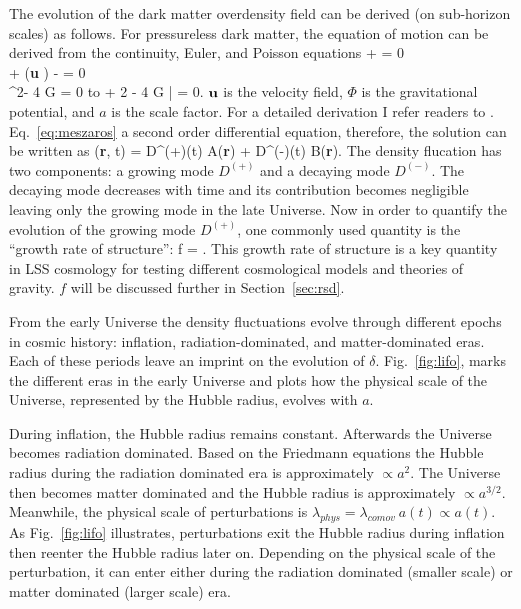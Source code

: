 The evolution of the dark matter overdensity field can be derived (on 
sub-horizon scales) as follows. For pressureless dark matter, the equation of motion
can be derived from the continuity, Euler, and Poisson equations
\beqa 
{} + \nabla \dot {} = 0  \\ 
 + ({\bf u} \dot \nabla)  - \nabla\Phi = 0 \\ 
\nabla^2\Phi - 4 \pi G \rho = 0 
\eeqa
to 
\beq \label{eq:meszaros}
 + 2   - 4 \pi G \bar{\rho} \delta = 0.
\eeq
${\bf u}$ is the velocity field, $\Phi$ is the gravitational potential, and $a$ 
is the scale factor. For a detailed derivation I refer readers to . Eq.~\ref{eq:meszaros} a second order differential equation, therefore,
the solution can be written as 
\beq 
\delta({\bf r}, t) = D^{(+)}(t) A({\bf r}) + D^{(-)}(t) B({\bf r}).
\eeq
The density flucation has two components: a growing mode $D^{(+)}$ and a decaying 
mode $D^{(-)}$. The decaying mode decreases with time and its contribution becomes negligible
leaving only the growing mode in the late Universe. Now in order to quantify
the evolution of the growing mode $D^{(+)}$, one commonly used quantity is the 
``growth rate of structure'': 
\beq \label{eq:f_growth}
f = . 
\eeq
This growth rate of structure is a key quantity in LSS cosmology for testing different 
cosmological models and theories of gravity. $f$ will be discussed further in Section~\ref{sec:rsd}.

From the early Universe the density fluctuations evolve through different epochs in 
cosmic history: inflation, radiation-dominated, and matter-dominated eras. Each of 
these periods leave an imprint on the evolution of $\delta$. Fig.~\ref{fig:lifo}, 
marks the different eras in the early Universe and plots how the physical scale of 
the Universe, represented by the Hubble radius, evolves with $a$. 

During inflation, the Hubble radius remains constant. Afterwards the Universe 
becomes radiation dominated. Based on the Friedmann equations the Hubble radius 
during the radiation dominated era is approximately $\propto a^{2}$. The Universe then 
becomes matter dominated and the Hubble radius is approximately $\propto a^{3/2}$. 
Meanwhile, the physical scale of perturbations is 
$\lambda_{phys} = \lambda_{comov}\ a(t) \propto a(t)$. As Fig.~\ref{fig:lifo} 
illustrates, perturbations exit the Hubble radius during inflation then 
reenter the Hubble radius later on. Depending on the physical scale of the 
perturbation, it can enter either during the radiation dominated  
(smaller scale) or matter dominated (larger scale) era. 


